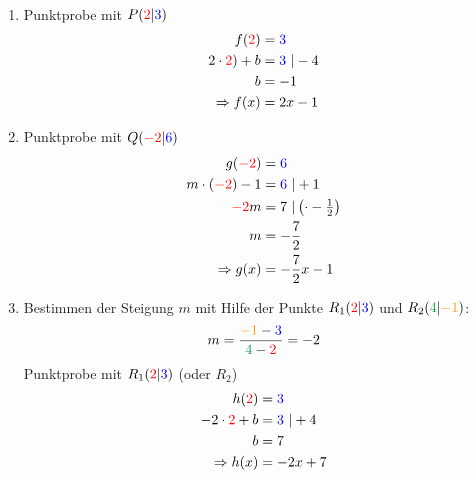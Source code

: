\begin{Answer}[ref=punktprobeA2]\vspace{-\baselineskip}\\
	\begin{minipage}[t]{0.5\textwidth}
		\begin{enumerate}[label=\alph*)]
			\item Punktprobe mit $P(\textcolor{red}{2}|\textcolor{blue}{3})$
			\begin{align*}
				f(\textcolor{red}{2})&=\textcolor{blue}{3}\\
				2\cdot\textcolor{red}{2})+b&=\textcolor{blue}{3}\ \vert-4\\
				b&=-1\\
				\Rightarrow f(x)&=2x-1
			\end{align*}
			\item Punktprobe mit $Q(\textcolor{red}{-2}|\textcolor{blue}{6})$
			\begin{align*}
				g(\textcolor{red}{-2})&=\textcolor{blue}{6}\\
				m\cdot\left(\textcolor{red}{-2}\right)-1&=\textcolor{blue}{6}\ \vert+1\\
				\textcolor{red}{-2}m&=7\ \vert\left(\cdot -\tfrac{1}{2}\right)\\
				m&=-\dfrac{7}{2}\\
				\Rightarrow g(x)&=-\dfrac{7}{2}x-1
			\end{align*}
		\end{enumerate}
	\end{minipage}
	\begin{minipage}[t]{0.5\textwidth}
		\begin{enumerate}[label=\alph*)]
			\setcounter{enumi}{2}
			\item Bestimmen der Steigung $m$ mit Hilfe der Punkte $R_1(\textcolor{red}{2}|\textcolor{blue}{3})$ und $R_2(\textcolor{ForestGreen}{4}|\textcolor{YellowOrange}{-1})$:
			\begin{align*}
				m=\dfrac{\textcolor{YellowOrange}{-1}-\textcolor{blue}{3}}{\textcolor{ForestGreen}{4}-\textcolor{red}{2}}=-2
			\end{align*}
			Punktprobe mit $R_1(\textcolor{red}{2}|\textcolor{blue}{3})$ (oder $R_2$)
			\begin{align*}
				h(\textcolor{red}{2})&=\textcolor{blue}{3}\\
				-2\cdot\textcolor{red}{2}+b&=\textcolor{blue}{3}\ \vert +4\\
				b&=7\\
				\Rightarrow h(x)&=-2x+7

\end{align*}
\end{enumerate}
\end{minipage}
\end{Answer}
